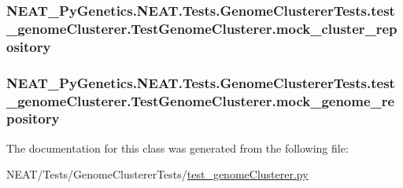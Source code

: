 \subsubsection[{\texorpdfstring{mock\+\_\+cluster\+\_\+repository}{mock_cluster_repository}}]{\setlength{\rightskip}{0pt plus 5cm}N\+E\+A\+T\+\_\+\+Py\+Genetics.\+N\+E\+A\+T.\+Tests.\+Genome\+Clusterer\+Tests.\+test\+\_\+genome\+Clusterer.\+Test\+Genome\+Clusterer.\+mock\+\_\+cluster\+\_\+repository}\hypertarget{classNEAT__PyGenetics_1_1NEAT_1_1Tests_1_1GenomeClustererTests_1_1test__genomeClusterer_1_1TestGenomeClusterer_a78d0e64bf2b3100d5d291f433c7020eb}{}\label{classNEAT__PyGenetics_1_1NEAT_1_1Tests_1_1GenomeClustererTests_1_1test__genomeClusterer_1_1TestGenomeClusterer_a78d0e64bf2b3100d5d291f433c7020eb}
\subsubsection[{\texorpdfstring{mock\+\_\+genome\+\_\+repository}{mock_genome_repository}}]{\setlength{\rightskip}{0pt plus 5cm}N\+E\+A\+T\+\_\+\+Py\+Genetics.\+N\+E\+A\+T.\+Tests.\+Genome\+Clusterer\+Tests.\+test\+\_\+genome\+Clusterer.\+Test\+Genome\+Clusterer.\+mock\+\_\+genome\+\_\+repository}\hypertarget{classNEAT__PyGenetics_1_1NEAT_1_1Tests_1_1GenomeClustererTests_1_1test__genomeClusterer_1_1TestGenomeClusterer_a1abfe40b10ff6d4cd6a58f4fca6c76b8}{}\label{classNEAT__PyGenetics_1_1NEAT_1_1Tests_1_1GenomeClustererTests_1_1test__genomeClusterer_1_1TestGenomeClusterer_a1abfe40b10ff6d4cd6a58f4fca6c76b8}


The documentation for this class was generated from the following file\+:\begin{DoxyCompactItemize}
\item 
N\+E\+A\+T/\+Tests/\+Genome\+Clusterer\+Tests/\hyperlink{test__genomeClusterer_8py}{test\+\_\+genome\+Clusterer.\+py}\end{DoxyCompactItemize}
